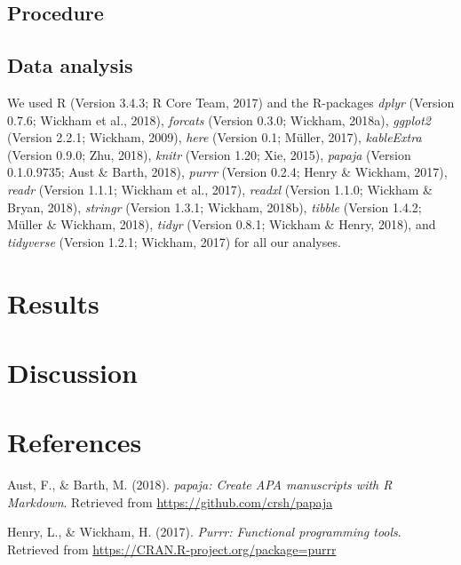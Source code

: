 \documentclass[,man]{apa6}
\begin{document}
\hypertarget{procedure}{%
\subsection{Procedure}\label{procedure}}

\hypertarget{data-analysis}{%
\subsection{Data analysis}\label{data-analysis}}

We used R (Version 3.4.3; R Core Team, 2017) and the R-packages
\emph{dplyr} (Version 0.7.6; Wickham et al., 2018), \emph{forcats}
(Version 0.3.0; Wickham, 2018a), \emph{ggplot2} (Version 2.2.1; Wickham,
2009), \emph{here} (Version 0.1; Müller, 2017), \emph{kableExtra}
(Version 0.9.0; Zhu, 2018), \emph{knitr} (Version 1.20; Xie, 2015),
\emph{papaja} (Version 0.1.0.9735; Aust \& Barth, 2018), \emph{purrr}
(Version 0.2.4; Henry \& Wickham, 2017), \emph{readr} (Version 1.1.1;
Wickham et al., 2017), \emph{readxl} (Version 1.1.0; Wickham \& Bryan,
2018), \emph{stringr} (Version 1.3.1; Wickham, 2018b), \emph{tibble}
(Version 1.4.2; Müller \& Wickham, 2018), \emph{tidyr} (Version 0.8.1;
Wickham \& Henry, 2018), and \emph{tidyverse} (Version 1.2.1; Wickham,
2017) for all our analyses.

\hypertarget{results}{%
\section{Results}\label{results}}

\hypertarget{discussion}{%
\section{Discussion}\label{discussion}}

\newpage

\hypertarget{references}{%
\section{References}\label{references}}

\begingroup
\setlength{\parindent}{-0.5in}
\setlength{\leftskip}{0.5in}

\hypertarget{refs}{}
\leavevmode\hypertarget{ref-R-papaja}{}%
Aust, F., \& Barth, M. (2018). \emph{papaja: Create APA manuscripts with
R Markdown}. Retrieved from \url{https://github.com/crsh/papaja}

\leavevmode\hypertarget{ref-R-purrr}{}%
Henry, L., \& Wickham, H. (2017). \emph{Purrr: Functional programming
tools}. Retrieved from \url{https://CRAN.R-project.org/package=purrr}
\end{document}
